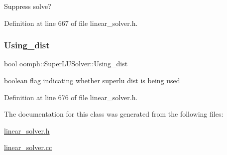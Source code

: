 Suppress solve? 



Definition at line 667 of file linear\+\_\+solver.\+h.

\mbox{\label{classoomph_1_1SuperLUSolver_a7420188d74f95b5b1543268ff3ccc9e0}} 
\subsubsection{\texorpdfstring{Using\+\_\+dist}{Using\_dist}}
{\footnotesize\ttfamily bool oomph\+::\+Super\+L\+U\+Solver\+::\+Using\+\_\+dist\hspace{0.3cm}{\ttfamily [private]}}



boolean flag indicating whether superlu dist is being used 



Definition at line 676 of file linear\+\_\+solver.\+h.



The documentation for this class was generated from the following files\+:\begin{DoxyCompactItemize}
\item 
\hyperlink{linear__solver_8h}{linear\+\_\+solver.\+h}\item 
\hyperlink{linear__solver_8cc}{linear\+\_\+solver.\+cc}\end{DoxyCompactItemize}
